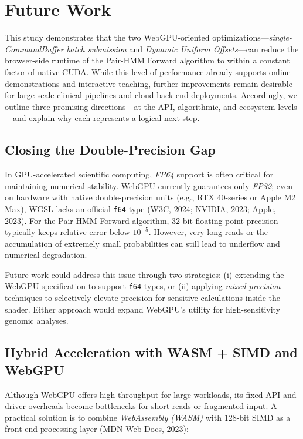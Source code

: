 \documentclass[PhD]{PHlab-thesis}
\begin{document}
\chapter{Future Work}

This study demonstrates that the two WebGPU-oriented optimizations—\emph{single-CommandBuffer batch submission} and \emph{Dynamic Uniform Offsets}—can reduce the browser-side runtime of the Pair-HMM Forward algorithm to within a constant factor of native CUDA. While this level of performance already supports online demonstrations and interactive teaching, further improvements remain desirable for large-scale clinical pipelines and cloud back-end deployments. Accordingly, we outline three promising directions—at the API, algorithmic, and ecosystem levels—and explain why each represents a logical next step.

\section{Closing the Double-Precision Gap}

In GPU-accelerated scientific computing, \emph{FP64} support is often critical for maintaining numerical stability. WebGPU currently guarantees only \emph{FP32}; even on hardware with native double-precision units (e.g., RTX 40-series or Apple M2 Max), WGSL lacks an official \texttt{f64} type (W3C, 2024; NVIDIA, 2023; Apple, 2023). For the Pair-HMM Forward algorithm, 32-bit floating-point precision typically keeps relative error below $10^{-5}$. However, very long reads or the accumulation of extremely small probabilities can still lead to underflow and numerical degradation.

Future work could address this issue through two strategies: (i) extending the WebGPU specification to support \texttt{f64} types, or (ii) applying \emph{mixed-precision} techniques to selectively elevate precision for sensitive calculations inside the shader. Either approach would expand WebGPU's utility for high-sensitivity genomic analyses.

\section{Hybrid Acceleration with WASM + SIMD and WebGPU}

Although WebGPU offers high throughput for large workloads, its fixed API and driver overheads become bottlenecks for short reads or fragmented input. A practical solution is to combine \emph{WebAssembly (WASM)} with 128-bit SIMD as a front-end processing layer (MDN Web Docs, 2023):
\end{document}
